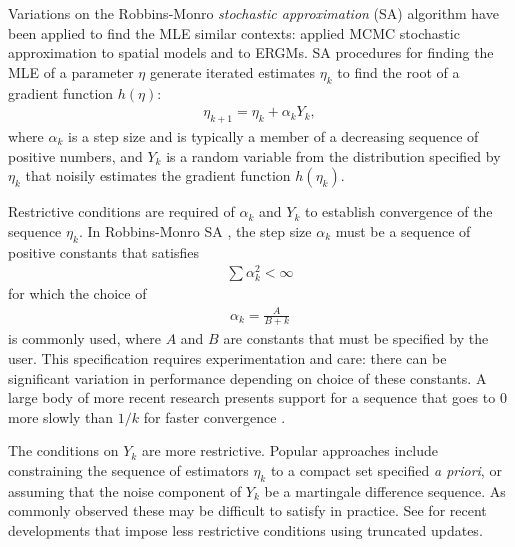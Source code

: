 Variations on the Robbins-Monro \emph{stochastic approximation} (SA) algorithm 
\citep{Robbins-Monro} have been applied to find the MLE similar contexts: 
\citet{Younes:1988,Younes:1989,Moyeed:1991,Gu:2001}
applied MCMC stochastic approximation to spatial models and \citet{Snijders:2002} to 
ERGMs.
SA procedures for finding the MLE of a parameter $\eta$ generate iterated estimates 
$\eta_k$ to find the 
root of a gradient function $h(\eta)$:
\begin{align} \label{E:eta SA update}
	\eta_{k+1} = \eta_k + \alpha_k Y_k,
\end{align}
where $\alpha_k$ is a step size and is typically a member of a decreasing sequence of 
positive numbers, and $Y_k$ is a 
random variable from the distribution specified by $\eta_k$ that noisily estimates the 
gradient function $h(\eta_k)$.  

Restrictive conditions are required of $\alpha_k$ and $Y_k$ to establish convergence 
of the sequence $\eta_k$.  
In Robbins-Monro SA \citep{Robbins-Monro}, the step size $\alpha_k$ must be a sequence 
of positive constants 
that satisfies 
\begin{align*}
	\sum \alpha_k^2 < \infty
\end{align*}
for which the choice of
\begin{align} \label{E:SA step size}
	\alpha_k = \frac{A}{B + k}
\end{align}
 is commonly used, where $A$ and $B$ are constants that must be specified by the user.  
This specification requires experimentation and care: there can be significant 
variation in performance depending on choice of these constants. 
A large body of more recent research presents support for a sequence that goes to 0 
more slowly than $1/k$ 
for faster convergence \citep[Chapter 11]{Kushner:1997}.  

The conditions on $Y_k$ are more restrictive.  Popular approaches include constraining 
the sequence of estimators $\eta_k$ to a compact set specified \emph{a priori}, 
or assuming that the noise component of $Y_k$ be a martingale 
difference sequence.  As commonly observed \citep*{Chen:2002,Andrieu:2005,Liang:2010} 
these may be 
difficult to satisfy in practice.  
See \citep{Andrieu:2005,Liang:2010} for recent developments that impose less 
restrictive conditions using truncated 
updates.


